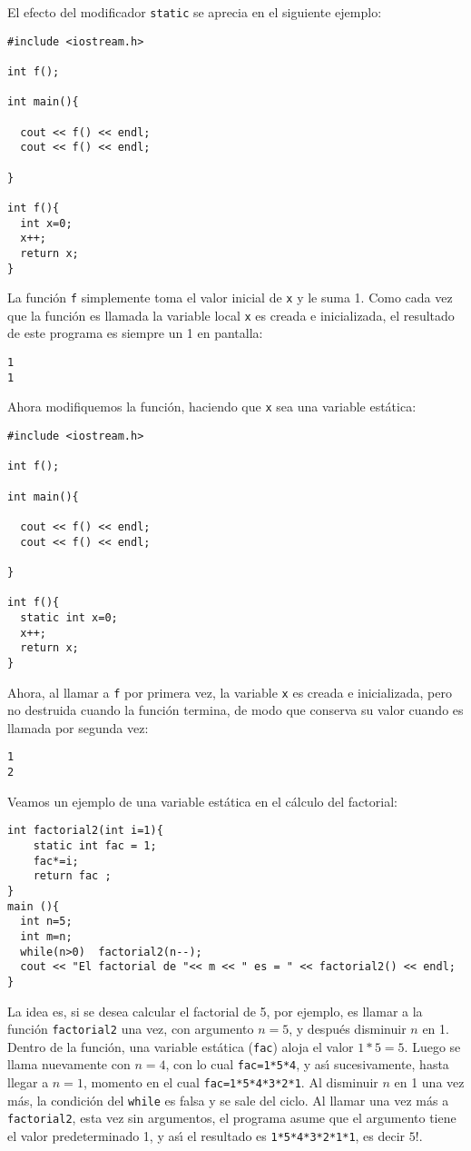 El efecto del modificador \verb+static+ se aprecia en el siguiente
ejemplo: 

\begin{verbatim}
#include <iostream.h>

int f();

int main(){

  cout << f() << endl;
  cout << f() << endl;

}

int f(){
  int x=0;
  x++;
  return x;
}
\end{verbatim}

La funci\'on \verb+f+ simplemente toma el valor inicial de \verb+x+ y
le suma 1. Como cada vez que la funci\'on es llamada la variable local
\verb+x+ es creada e inicializada, el resultado de este programa es
siempre un 1 en pantalla:
\begin{verbatim}
1
1
\end{verbatim}

Ahora modifiquemos la funci\'on, haciendo que \verb+x+ sea una
variable est\'atica:
\begin{verbatim}
#include <iostream.h>

int f();

int main(){

  cout << f() << endl;
  cout << f() << endl;

}

int f(){
  static int x=0;
  x++;
  return x;
}
\end{verbatim}

Ahora, al llamar a \verb+f+ por primera vez, la variable \verb+x+ es
creada e inicializada, pero no destruida cuando la funci\'on termina,
de modo que conserva su valor cuando es llamada por segunda vez:
\begin{verbatim}
1
2
\end{verbatim}


Veamos
un ejemplo de una variable est{\'a}tica en el c{\'a}lculo del factorial:
\begin{verbatim}
int factorial2(int i=1){
    static int fac = 1;
    fac*=i;
    return fac ;
}
main (){
  int n=5;   
  int m=n;
  while(n>0)  factorial2(n--);
  cout << "El factorial de "<< m << " es = " << factorial2() << endl; 
}
\end{verbatim}
La idea es, si se desea calcular el factorial de 5, por ejemplo, es
llamar a la funci\'on \verb+factorial2+ 
una vez, con argumento $n=5$, y despu\'es
disminuir $n$ en 1. Dentro de la funci\'on, una variable est\'atica
(\verb+fac+) 
aloja el valor $1*5=5$. Luego se llama nuevamente con $n=4$, con lo
cual \verb+fac=1*5*4+,  y as\'{\i}
sucesivamente, hasta llegar a $n=1$, momento en el cual
\verb+fac=1*5*4*3*2*1+. Al disminuir $n$ en 1 una vez m\'as, la
condici\'on del \verb+while+ es falsa y se sale del ciclo. Al llamar
una vez m\'as a \verb+factorial2+, esta vez sin argumentos, el
programa asume que el argumento tiene el valor predeterminado 1, y
as\'{\i} el resultado es \verb+1*5*4*3*2*1*1+, es decir $5!$.

